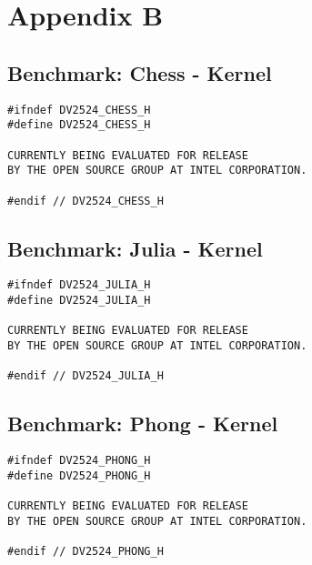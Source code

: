 
\chapter*{Appendix B}
\label{cha:appendixb}


\section*{Benchmark: Chess - Kernel}
\label{sec:appendixb_benchmarkchesskernel}
\begin{lstlisting}
#ifndef DV2524_CHESS_H
#define DV2524_CHESS_H

CURRENTLY BEING EVALUATED FOR RELEASE
BY THE OPEN SOURCE GROUP AT INTEL CORPORATION.

#endif // DV2524_CHESS_H
\end{lstlisting}

\section*{Benchmark: Julia - Kernel}
\label{sec:appendixb_benchmarkjuliakernel}
\begin{lstlisting}
#ifndef DV2524_JULIA_H
#define DV2524_JULIA_H

CURRENTLY BEING EVALUATED FOR RELEASE
BY THE OPEN SOURCE GROUP AT INTEL CORPORATION.

#endif // DV2524_JULIA_H
\end{lstlisting}

\section*{Benchmark: Phong - Kernel}
\label{sec:appendixb_benchmarkphongkernel}
\begin{lstlisting}
#ifndef DV2524_PHONG_H
#define DV2524_PHONG_H

CURRENTLY BEING EVALUATED FOR RELEASE
BY THE OPEN SOURCE GROUP AT INTEL CORPORATION.

#endif // DV2524_PHONG_H
\end{lstlisting}
